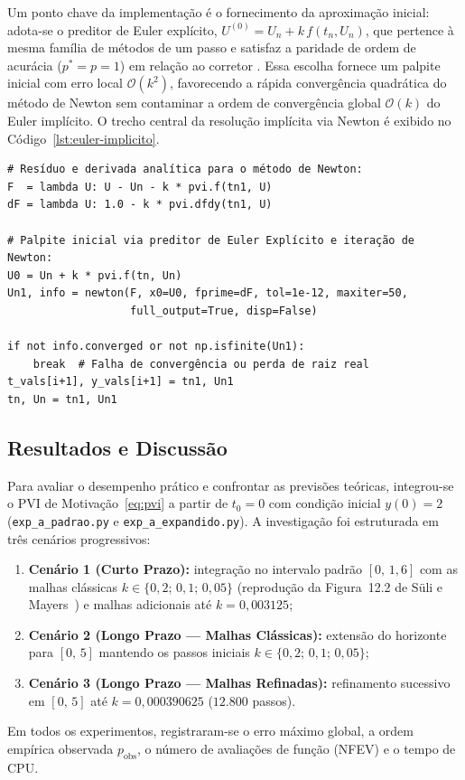 \documentclass[12pt, a4paper]{article}
\begin{document}
Um ponto chave da implementação é o fornecimento da aproximação inicial: adota-se o
preditor de Euler explícito,
$U^{(0)} = U_n + k\,f(t_n, U_n)$, que pertence à mesma família de métodos de um passo e satisfaz a paridade de ordem de acurácia ($p^* = p = 1$) em relação ao corretor \cite{lambert1991}. Essa escolha fornece um palpite inicial com erro local $\mathcal{O}(k^2)$, favorecendo a rápida convergência quadrática do método de Newton sem contaminar a ordem de convergência global $\mathcal{O}(k)$ do Euler implícito.
O trecho central da resolução implícita via Newton é exibido no Código~\ref{lst:euler-implicito}.
\begin{listing}[H]
\caption{Núcleo iterativo do método de Euler Implícito com Newton.}\label{lst:euler-implicito}
\begin{verbatim}
# Resíduo e derivada analítica para o método de Newton:
F  = lambda U: U - Un - k * pvi.f(tn1, U)
dF = lambda U: 1.0 - k * pvi.dfdy(tn1, U)

# Palpite inicial via preditor de Euler Explícito e iteração de Newton:
U0 = Un + k * pvi.f(tn, Un)
Un1, info = newton(F, x0=U0, fprime=dF, tol=1e-12, maxiter=50,
                   full_output=True, disp=False)

if not info.converged or not np.isfinite(Un1):
    break  # Falha de convergência ou perda de raiz real
t_vals[i+1], y_vals[i+1] = tn1, Un1
tn, Un = tn1, Un1
\end{verbatim}
\end{listing}

\subsection{Resultados e Discussão}
\label{sec:a-resultados}

Para avaliar o desempenho prático e confrontar as previsões teóricas, integrou-se o PVI de Motivação~\eqref{eq:pvi} a partir de $t_0 = 0$ com condição inicial $y(0) = 2$ (\texttt{exp\_a\_padrao.py} e \texttt{exp\_a\_expandido.py}). A investigação foi estruturada em três cenários progressivos:
\begin{enumerate}
  \item \textbf{Cenário 1 (Curto Prazo):} integração no intervalo padrão $[0,\, 1{,}6]$ com as malhas clássicas $k \in \{0{,}2;\, 0{,}1;\, 0{,}05\}$ (reprodução da Figura~12.2 de Süli e Mayers~\cite{suli2003}) e malhas adicionais até $k = 0{,}003125$;
  \item \textbf{Cenário 2 (Longo Prazo --- Malhas Clássicas):} extensão do horizonte para $[0,\, 5]$ mantendo os passos iniciais $k \in \{0{,}2;\, 0{,}1;\, 0{,}05\}$;
  \item \textbf{Cenário 3 (Longo Prazo --- Malhas Refinadas):} refinamento sucessivo em $[0,\, 5]$ até $k = 0{,}000390625$ ($12.800$ passos).
\end{enumerate}
Em todos os experimentos, registraram-se o erro máximo global, a ordem empírica observada $p_{\text{obs}}$, o número de avaliações de função (NFEV) e o tempo de CPU.
\end{document}
